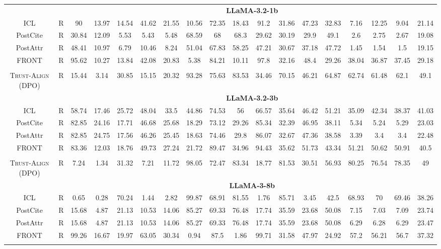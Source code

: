 \documentclass{article} %
\newcommand{\method}[0]{\textsc{Trust-Align}}
\begin{document}
\begin{table}[htb!]
{\begin{tabular}{ccc*{15}c}
& & \multicolumn{16}{c}{\cellcolor[gray]{0.9}\textbf{LLaMA-3.2-1b}} \\
ICL & R & 90 & 13.97 & 14.54 & 41.62 & 21.55 & 10.56 & 72.35 & 18.43 & 91.2 & 31.86 & 47.23 & 32.83 & 7.16 & 12.25 & 9.04 & 21.14 \\
PostCite & R & 30.84 & 12.09 & 5.53 & 5.43 & 5.48 & 68.59 & 68 & 68.3 & 29.62 & 30.19 & 29.9 & 49.1 & 2.6 & 2.75 & 2.67 & 19.08 \\
PostAttr & R & 48.41 & 10.97 & 6.79 & 10.46 & 8.24 & 51.04 & 67.83 & 58.25 & 47.21 & 30.67 & 37.18 & 47.72 & 1.45 & 1.54 & 1.5 & 19.15 \\
FRONT & R & 95.62 & 10.27 & 13.84 & 42.08 & 20.83 & 5.38 & 84.21 & 10.11 & 97.8 & 32.16 & 48.4 & 29.26 & 38.04 & 36.87 & 37.45 & 29.18 \\\\

\method{} (DPO) & R & 15.44 & 3.14 & 30.85 & 15.15 & 20.32 & 93.28 & 75.63 & 83.53 & 34.46 & 70.15 & 46.21 & 64.87 & 62.74 & 61.48 & 62.1 & 49.1 \\

& & \multicolumn{16}{c}{\cellcolor[gray]{0.9}\textbf{LLaMA-3.2-3b}} \\
ICL & R & 58.74 & 17.46 & 25.72 & 48.04 & 33.5 & 44.86 & 74.53 & 56 & 66.57 & 35.64 & 46.42 & 51.21 & 35.09 & 42.34 & 38.37 & 41.03 \\
PostCite & R & 82.85 & 24.16 & 17.71 & 46.68 & 25.68 & 18.29 & 73.12 & 29.26 & 85.34 & 32.39 & 46.95 & 38.11 & 5.34 & 5.24 & 5.29 & 23.03 \\
PostAttr & R & 82.85 & 24.75 & 17.56 & 46.26 & 25.45 & 18.63 & 74.46 & 29.8 & 86.07 & 32.67 & 47.36 & 38.58 & 3.39 & 3.4 & 3.4 & 22.48 \\
FRONT & R & 83.36 & 12.03 & 18.76 & 49.73 & 27.24 & 21.72 & 89.47 & 34.96 & 94.43 & 35.62 & 51.73 & 43.34 & 51.21 & 50.62 & 50.91 & 40.5 \\\\

\method{} (DPO) & R & 7.24 & 1.34 & 31.32 & 7.21 & 11.72 & 98.05 & 72.47 & 83.34 & 18.77 & 81.53 & 30.51 & 56.93 & 80.25 & 76.54 & 78.35 & 49 \\

& & \multicolumn{16}{c}{\cellcolor[gray]{0.9}\textbf{LLaMA-3-8b}} \\
ICL & R & 0.65 & 0.28 & 70.24 & 1.44 & 2.82 & 99.87 & 68.91 & 81.55 & 1.76 & 85.71 & 3.45 & 42.5 & 68.93 & 70 & 69.46 & 38.26 \\
PostCite & R & 15.68 & 4.87 & 21.13 & 10.53 & 14.06 & 85.27 & 69.33 & 76.48 & 17.74 & 35.59 & 23.68 & 50.08 & 7.15 & 7.03 & 7.09 & 23.74 \\
PostAttr & R & 15.68 & 4.87 & 21.13 & 10.53 & 14.06 & 85.27 & 69.33 & 76.48 & 17.74 & 35.59 & 23.68 & 50.08 & 6.29 & 6.28 & 6.29 & 23.47 \\
FRONT & R & 99.26 & 16.67 & 19.97 & 63.05 & 30.34 & 0.94 & 87.5 & 1.86 & 99.71 & 31.58 & 47.97 & 24.92 & 57.2 & 56.21 & 56.7 & 37.32 \\\\


\end{tabular}}
\end{table}
\end{document}
